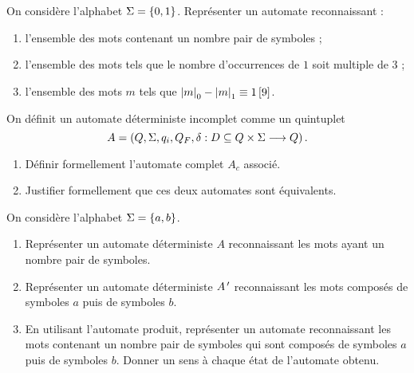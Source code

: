 \begin{corr}
\end{corr}

\begin{exo}
On considère l'alphabet \(\Sigma=\left\lbrace0,1\right\rbrace\). Représenter un automate reconnaissant :

\begin{enumerate}
    \item l'ensemble des mots contenant un nombre pair de symboles ; \\
    \item l'ensemble des mots tels que le nombre d'occurrences de \(1\) soit multiple de \(3\) ; \\
    \item l'ensemble des mots \(m\) tels que \(\left\lvert m\right\rvert_0-\left\lvert m\right\rvert_1\equiv1\left[9\right]\).
\end{enumerate}
\end{exo}

\begin{corr}
\end{corr}

\begin{exo}
On définit un automate déterministe incomplet comme un quintuplet \[A=\left(Q,\Sigma,q_i,Q_F,\delta:D\subseteq Q\times\Sigma\longrightarrow Q\right).\]

\begin{enumerate}
    \item Définir formellement l'automate complet \(A_c\) associé. \\
    \item Justifier formellement que ces deux automates sont équivalents.
\end{enumerate}
\end{exo}

\begin{corr}
\end{corr}

\begin{exo}
On considère l'alphabet \(\Sigma=\left\lbrace a,b\right\rbrace\).

\begin{enumerate}
    \item Représenter un automate déterministe \(A\) reconnaissant les mots ayant un nombre pair de symboles. \\
    \item Représenter un automate déterministe \(A^{\,\prime}\) reconnaissant les mots composés de symboles \(a\) puis de symboles \(b\). \\
    \item En utilisant l'automate produit, représenter un automate reconnaissant les mots contenant un nombre pair de symboles qui sont composés de symboles \(a\) puis de symboles \(b\). Donner un sens à chaque état de l'automate obtenu.
\end{enumerate}
\end{exo}

